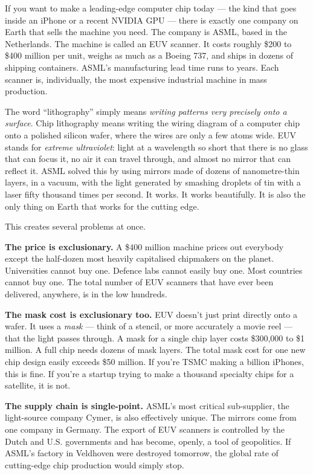 \documentclass[11pt,letterpaper]{article}
\begin{document}
If you want to make a leading-edge computer chip today --- the kind that goes inside an iPhone or a recent NVIDIA GPU --- there is exactly one company on Earth that sells the machine you need. The company is ASML, based in the Netherlands. The machine is called an EUV scanner. It costs roughly \$200 to \$400 million per unit, weighs as much as a Boeing 737, and ships in dozens of shipping containers. ASML's manufacturing lead time runs to years. Each scanner is, individually, the most expensive industrial machine in mass production.

The word ``lithography'' simply means \emph{writing patterns very precisely onto a surface}. Chip lithography means writing the wiring diagram of a computer chip onto a polished silicon wafer, where the wires are only a few atoms wide. EUV stands for \emph{extreme ultraviolet}: light at a wavelength so short that there is no glass that can focus it, no air it can travel through, and almost no mirror that can reflect it. ASML solved this by using mirrors made of dozens of nanometre-thin layers, in a vacuum, with the light generated by smashing droplets of tin with a laser fifty thousand times per second. It works. It works beautifully. It is also the only thing on Earth that works for the cutting edge.

This creates several problems at once.

\textbf{The price is exclusionary.} A \$400 million machine prices out everybody except the half-dozen most heavily capitalised chipmakers on the planet. Universities cannot buy one. Defence labs cannot easily buy one. Most countries cannot buy one. The total number of EUV scanners that have ever been delivered, anywhere, is in the low hundreds.

\textbf{The mask cost is exclusionary too.} EUV doesn't just print directly onto a wafer. It uses a \emph{mask} --- think of a stencil, or more accurately a movie reel --- that the light passes through. A mask for a single chip layer costs \$300{,}000 to \$1 million. A full chip needs dozens of mask layers. The total mask cost for one new chip design easily exceeds \$50 million. If you're TSMC making a billion iPhones, this is fine. If you're a startup trying to make a thousand specialty chips for a satellite, it is not.

\textbf{The supply chain is single-point.} ASML's most critical sub-supplier, the light-source company Cymer, is also effectively unique. The mirrors come from one company in Germany. The export of EUV scanners is controlled by the Dutch and U.S. governments and has become, openly, a tool of geopolitics. If ASML's factory in Veldhoven were destroyed tomorrow, the global rate of cutting-edge chip production would simply stop.
\end{document}
